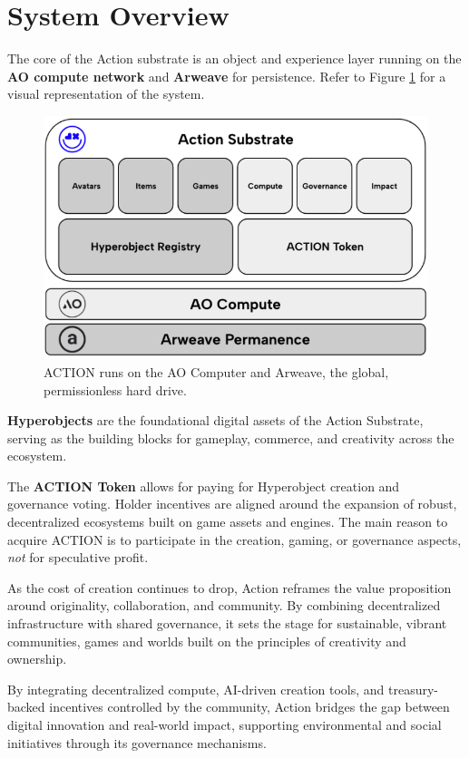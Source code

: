 \section{System Overview}

The core of the Action substrate is an object and experience layer running on the \textbf{AO compute network} \cite{Williams2024} and \textbf{Arweave} \cite{Williams2023} for persistence. Refer to Figure \ref{fig:system_overview} for a visual representation of the system.

\begin{figure}
  \centering
  \includegraphics[width=0.95\columnwidth]{images/image3.png}
  \vspace{1em}
  \caption{ACTION runs on the AO Computer and Arweave, the global, permissionless hard drive.}
  \label{fig:system_overview}
\end{figure}

\textbf{Hyperobjects} are the foundational digital assets of the Action Substrate, serving as the building blocks for gameplay, commerce, and creativity across the ecosystem.

The \textbf{ACTION Token} allows for paying for Hyperobject creation and governance voting. Holder incentives are aligned around the expansion of robust, decentralized ecosystems built on game assets and engines. The main reason to acquire ACTION is to participate in the creation, gaming, or governance aspects, \textit{not} for speculative profit.

As the cost of creation continues to drop, Action reframes the value proposition around originality, collaboration, and community. By combining decentralized infrastructure with shared governance, it sets the stage for sustainable, vibrant communities, games and worlds built on the principles of creativity and ownership.

By integrating decentralized compute, AI-driven creation tools, and treasury-backed incentives controlled by the community, Action bridges the gap between digital innovation and real-world impact, supporting environmental and social initiatives through its governance mechanisms.

